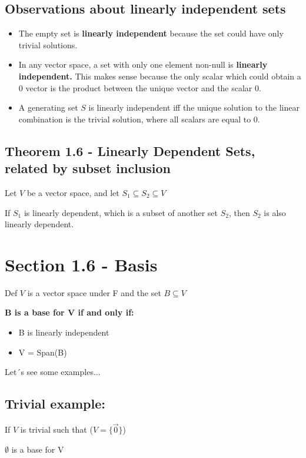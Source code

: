 \documentclass{article}
\begin{document}
\subsection*{Observations about linearly independent sets}
\begin{itemize}
    \item The empty set is \textbf{linearly independent} because the set could have only trivial solutions. 
    \item In any vector space, a set with only one element non-null is \textbf{linearly independent.} This makes sense because the only scalar which could obtain a 0 vector is the product between the unique vector and the scalar 0.
    \item A generating set \(S\) is linearly independent iff the unique solution to the linear combination is the trivial solution, where all scalars are equal to 0.
\end{itemize}

\subsection*{Theorem 1.6 - Linearly Dependent Sets, related by subset inclusion}

Let \(V\) be a vector space, and let \(S_1 \subseteq S_2 \subseteq V\)

If \(S_1\) is linearly dependent, which is a subset of another set \(S_2\), then \(S_2\) is also linearly dependent.

\section*{Section 1.6 - Basis}
Def \(V\) is a vector space under F and the set \(B \subseteq V\)

\textbf{B is a base for V if and only if:}
\begin{itemize}
    \item B is linearly independent
    \item V = Span(B)
\end{itemize}

Let´s see some examples...

\subsection*{Trivial example:}

If \(V\) is trivial such that (\(V = \{ \vec{0}\}\))

\(\emptyset\) is a base for V
\end{document}
